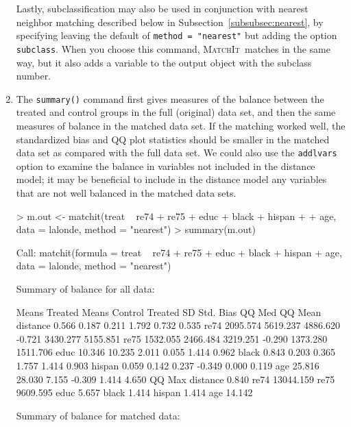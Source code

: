 \documentclass[oneside,letterpaper,titlepage]{article}
\newcommand{\MatchIt}{\textsc{MatchIt}}
\begin{document}
\begin{enumerate}
Lastly, subclassification may also be used in conjunction with nearest
neighbor matching described below in
Subsection~\ref{subsubsec:nearest}, by specifying leaving the default
of \texttt{method = "nearest"} but adding the option
\texttt{subclass}.  When you choose this command, \MatchIt\ matches in
the same way, but it also adds a variable to the output object with
the subclass number.


\item The \texttt{summary()} command first gives measures of the
  balance between the treated and control groups in the full
  (original) data set, and then the same measures of balance in the
  matched data set.  If the matching worked well, the standardized
  bias and QQ plot statistics should be smaller in the matched data
  set as compared with the full data set.  We could also use the
  \texttt{addlvars} option to examine the balance in variables not
  included in the distance model; it may be beneficial to include in
  the distance model any variables that are not well balanced in the
  matched data sets.

\begin{Schunk}
\begin{Sinput}
> m.out <- matchit(treat ~ re74 + re75 + educ + black + hispan + 
+     age, data = lalonde, method = "nearest")
> summary(m.out)
\end{Sinput}
\begin{Soutput}
Call:
matchit(formula = treat ~ re74 + re75 + educ + black + hispan +     age, data = lalonde, method = "nearest")

Summary of balance for all data:

         Means Treated Means Control Treated SD Std. Bias   QQ Med  QQ Mean
distance         0.566         0.187      0.211     1.792    0.732    0.535
re74          2095.574      5619.237   4886.620    -0.721 3430.277 5155.851
re75          1532.055      2466.484   3219.251    -0.290 1373.280 1511.706
educ            10.346        10.235      2.011     0.055    1.414    0.962
black            0.843         0.203      0.365     1.757    1.414    0.903
hispan           0.059         0.142      0.237    -0.349    0.000    0.119
age             25.816        28.030      7.155    -0.309    1.414    4.650
            QQ Max
distance     0.840
re74     13044.159
re75      9609.595
educ         5.657
black        1.414
hispan       1.414
age         14.142

Summary of balance for matched data:


\end{Soutput}
\end{Schunk}
\end{enumerate}
\end{document}
